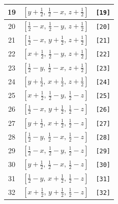 \documentclass[fleqn,8pt]{jsarticle}
\begin{document}
\begin{longtable}{ccc}
19 & $\left[ y + \frac{1}{2},\, \frac{1}{2} - x,\, z + \frac{1}{2} \right]$ & {\tt [19]} \\ \hline
20 & $\left[ \frac{1}{2} - x,\, \frac{1}{2} - y,\, z + \frac{1}{2} \right]$ & {\tt [20]} \\ \hline
21 & $\left[ \frac{1}{2} - x,\, y + \frac{1}{2},\, z + \frac{1}{2} \right]$ & {\tt [21]} \\ \hline
22 & $\left[ x + \frac{1}{2},\, \frac{1}{2} - y,\, z + \frac{1}{2} \right]$ & {\tt [22]} \\ \hline
23 & $\left[ \frac{1}{2} - y,\, \frac{1}{2} - x,\, z + \frac{1}{2} \right]$ & {\tt [23]} \\ \hline
24 & $\left[ y + \frac{1}{2},\, x + \frac{1}{2},\, z + \frac{1}{2} \right]$ & {\tt [24]} \\ \hline
25 & $\left[ x + \frac{1}{2},\, \frac{1}{2} - y,\, \frac{1}{2} - z \right]$ & {\tt [25]} \\ \hline
26 & $\left[ \frac{1}{2} - x,\, y + \frac{1}{2},\, \frac{1}{2} - z \right]$ & {\tt [26]} \\ \hline
27 & $\left[ y + \frac{1}{2},\, x + \frac{1}{2},\, \frac{1}{2} - z \right]$ & {\tt [27]} \\ \hline
28 & $\left[ \frac{1}{2} - y,\, \frac{1}{2} - x,\, \frac{1}{2} - z \right]$ & {\tt [28]} \\ \hline
29 & $\left[ \frac{1}{2} - x,\, \frac{1}{2} - y,\, \frac{1}{2} - z \right]$ & {\tt [29]} \\ \hline
30 & $\left[ y + \frac{1}{2},\, \frac{1}{2} - x,\, \frac{1}{2} - z \right]$ & {\tt [30]} \\ \hline
31 & $\left[ \frac{1}{2} - y,\, x + \frac{1}{2},\, \frac{1}{2} - z \right]$ & {\tt [31]} \\ \hline
32 & $\left[ x + \frac{1}{2},\, y + \frac{1}{2},\, \frac{1}{2} - z \right]$ & {\tt [32]} \\
\end{longtable}
\end{document}
